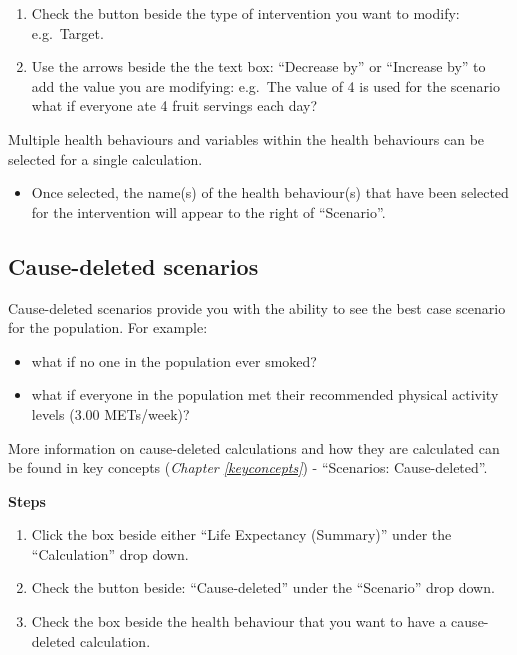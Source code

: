 \documentclass[]{book}
\providecommand{\tightlist}{%
  \setlength{\itemsep}{0pt}\setlength{\parskip}{0pt}}
\begin{document}
\begin{enumerate}
\def\labelenumi{\arabic{enumi}.}
\setcounter{enumi}{4}
\item
  Check the button beside the type of intervention you want to modify:
  e.g.~Target.
\item
  Use the arrows beside the the text box: ``Decrease by'' or ``Increase
  by'' to add the value you are modifying: e.g.~The value of 4 is used
  for the scenario what if everyone ate 4 fruit servings each day?
\end{enumerate}

Multiple health behaviours and variables within the health behaviours
can be selected for a single calculation.

\begin{itemize}
\tightlist
\item
  Once selected, the name(s) of the health behaviour(s) that have been
  selected for the intervention will appear to the right of
  ``Scenario''.
\end{itemize}

\subsection{Cause-deleted scenarios}\label{cause-deleted-scenarios}

Cause-deleted scenarios provide you with the ability to see the best
case scenario for the population. For example:

\begin{itemize}
\tightlist
\item
  what if no one in the population ever smoked?
\item
  what if everyone in the population met their recommended physical
  activity levels (3.00 METs/week)?
\end{itemize}

More information on cause-deleted calculations and how they are
calculated can be found in key concepts (\emph{Chapter
\ref{keyconcepts}}) - ``Scenarios: Cause-deleted''.

\textbf{Steps}

\begin{enumerate}
\def\labelenumi{\arabic{enumi}.}
\item
  Click the box beside either ``Life Expectancy (Summary)'' under the
  ``Calculation'' drop down.
\item
  Check the button beside: ``Cause-deleted'' under the ``Scenario'' drop
  down.
\item
  Check the box beside the health behaviour that you want to have a
  cause-deleted calculation.
\end{enumerate}
\end{document}
